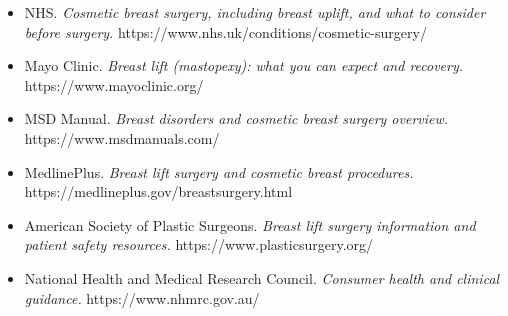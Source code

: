 \begin{itemize}
    \item NHS. \textit{Cosmetic breast surgery, including breast uplift, and what to consider before surgery.} https://www.nhs.uk/conditions/cosmetic-surgery/
    \item Mayo Clinic. \textit{Breast lift (mastopexy): what you can expect and recovery.} https://www.mayoclinic.org/
    \item MSD Manual. \textit{Breast disorders and cosmetic breast surgery overview.} https://www.msdmanuals.com/
    \item MedlinePlus. \textit{Breast lift surgery and cosmetic breast procedures.} https://medlineplus.gov/breastsurgery.html
    \item American Society of Plastic Surgeons. \textit{Breast lift surgery information and patient safety resources.} https://www.plasticsurgery.org/
    \item National Health and Medical Research Council. \textit{Consumer health and clinical guidance.} https://www.nhmrc.gov.au/
\end{itemize}
